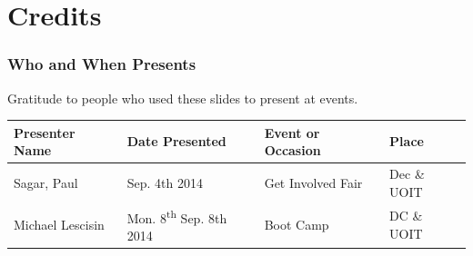 \documentclass{beamer}
\begin{document}
\section{Credits}
\begin{frame}
\frametitle{Who and When Presents}
Gratitude to people who used these slides to present at events.
\begin{table}
\tiny
\centering
\begin{tabular}{|p{2cm}|p{2cm}|p{2.4cm}|p{1.6cm}|}
\hline
\textbf{Presenter Name} & \textbf{Date Presented} & \textbf{Event or Occasion} & \textbf{Place}\\
\hline
Sagar, Paul & Sep. 4th 2014 & Get Involved Fair & Dec \& UOIT\\
\hline
Michael Lescisin & Mon. 8\textsuperscript{th} Sep. 8th 2014 & Boot Camp & DC \& UOIT\\
\hline
\end{tabular}
\end{table}
\end{frame}
\end{document}

